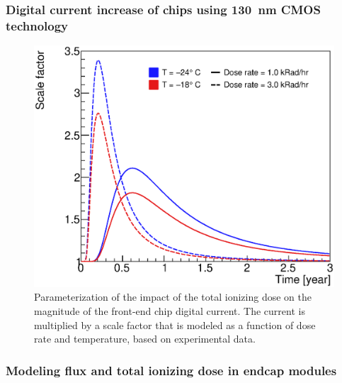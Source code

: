 \subsubsection{Digital current increase of chips using 130~nm CMOS technology}

\begin{figure}[ht]
\centering
\includegraphics[width=0.6\linewidth]{figures/AbcTidBumpVersionRatesAndTemps_Nominal.eps}
\caption{Parameterization of the impact of the total ionizing dose
on the magnitude of the front-end chip digital current. The current is multiplied by a scale factor
that is modeled as a function of dose rate and temperature, based on experimental data.}
\end{figure}

\subsubsection{Modeling flux and total ionizing dose in endcap modules}

